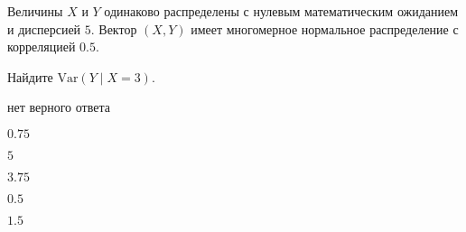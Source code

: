 
\begin{question}
Величины \(X\) и \(Y\) одинаково распределены с нулевым математическим
ожиданием и дисперсией \(5\). Вектор \((X, Y)\) имеет многомерное
нормальное распределение с корреляцией \(0.5\).

Найдите \(\mathrm{Var}(Y\mid X = 3)\).
\begin{answerlist}
  \item нет верного ответа
  \item \(0.75\)
  \item \(5\)
  \item \(3.75\)
  \item \(0.5\)
  \item \(1.5\)
\end{answerlist}
\end{question}


